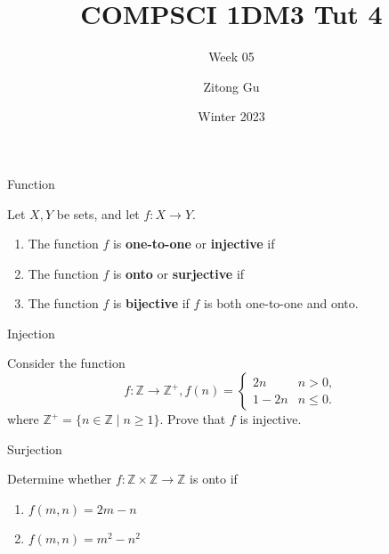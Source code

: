 \documentclass{beamer}
\title{COMPSCI 1DM3 Tut 4}
\subtitle{Week 05}
\author{Zitong Gu}
\institute{McMaster University}
\date{Winter 2023}
\begin{document}
\frame{\titlepage}

\begin{frame}{Function}
    \begin{definition}
        Let $X,Y$ be sets, and let $f: X \to Y$. 
        \begin{enumerate}
            \item The function $f$ is \textbf{one-to-one} or \textbf{injective} if 

            \vspace{8mm}

            \item The function $f$ is \textbf{onto} or \textbf{surjective} if

            \vspace{8mm}

            \item The function $f$ is \textbf{bijective} if $f$ is both one-to-one and onto.
            
        \end{enumerate}
    \end{definition}
\end{frame}

\begin{frame}[t]{Injection}
    \begin{example}
        Consider the function $$f: \mathbb{Z} \to \mathbb{Z}^{+}, f(n) =  \begin{cases} 
        2n & n > 0, \\
        1-2n & n \leq 0.
        \end{cases}
        $$ where $\mathbb{Z}^{+} = \{ n \in \mathbb{Z} \mid n \geq 1\}$. Prove that $f$ is injective. 
    \end{example}
\end{frame}

\begin{frame}{Surjection}
    \begin{example}
        Determine whether $f: \mathbb{Z} \times \mathbb{Z} \to \mathbb{Z}$ is onto if
        \begin{enumerate}
            \item $f(m,n) = 2m - n$
            
            \vspace{12mm}

            \item $f(m,n) = m^2 - n^2$
            
            \vspace{38mm}

        \end{enumerate}
    \end{example}
\end{frame}
\end{document}
